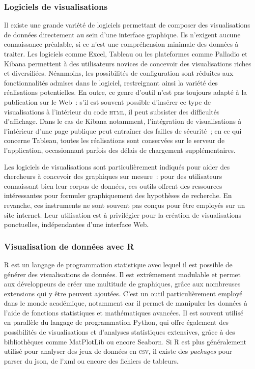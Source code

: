 \documentclass[a4paper,12pt,twoside]{book}
\newcommand{\eng}{\emph}
\newcommand{\html}{\textsc{html}\xspace}
\newcommand{\xml}{\gls{xml}\xspace}
\newcommand{\json}{\gls{json}\xspace}
\begin{document}
			\subsubsection{Logiciels de visualisations}
Il existe une grande variété de logiciels permettant de composer des visualisations de données directement au sein d'une interface graphique. Ils n'exigent aucune connaissance préalable, si ce n'est une compréhension minimale des données à traiter. Les logiciels comme Excel, Tableau ou les plateformes comme Palladio et Kibana permettent à des utilisateurs novices de concevoir des visualisations riches et diversifiées. Néanmoins, les possibilités de configuration sont réduites aux fonctionnalités admises dans le logiciel, restreignant ainsi la variété des réalisations potentielles. En outre, ce genre d'outil n'est pas toujours adapté à la publication sur le Web~: s'il est souvent possible d'insérer ce type de visualisations à l'intérieur du code \html, il peut subsister des difficultés d'affichage. Dans le cas de Kibana notamment, l'intégration de visualisations à l'intérieur d'une page publique peut entraîner des failles de sécurité~; en ce qui concerne Tableau, toutes les réalisations sont conservées sur le serveur de l'application, occasionnant parfois des délais de chargement supplémentaires.

Les logiciels de visualisations sont particulièrement indiqués pour aider des chercheurs à concevoir des graphiques sur mesure~: pour des utilisateurs connaissant bien leur corpus de données, ces outils offrent des ressources intéressantes pour formuler graphiquement des hypothèses de recherche. En revanche, ces instruments ne sont souvent pas conçus pour être employés sur un site internet. Leur utilisation est à privilégier pour la création de visualisations ponctuelles, indépendantes d'une interface Web.

			\subsubsection{Visualisation de données avec R}
R est un langage de programmation statistique avec lequel il est possible de générer des visualisations de données. Il est extrêmement modulable et permet aux développeurs de créer une multitude de graphiques, grâce aux nombreuses extensions qui y être peuvent ajoutées. C'est un outil particulièrement employé dans le monde académique, notamment car il permet de manipuler les données à l'aide de fonctions statistiques et mathématiques avancées. Il est souvent utilisé en parallèle du langage de programmation Python, qui offre également des possibilités de visualisations et d'analyses statistiques extensives, grâce à des bibliothèques comme MatPlotLib ou encore Seaborn. Si R est plus généralement utilisé pour analyser des jeux de données en \textsc{csv}, il existe des \eng{packages} pour parser du \json, de l'\xml ou encore des fichiers de tableurs.
\end{document}
